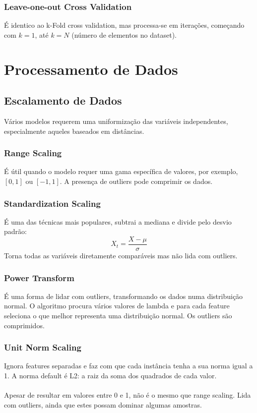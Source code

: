 \documentclass[10pt,a4paper]{report}
\begin{document}
\subsection{Leave-one-out Cross Validation}
É identico ao k-Fold cross validation, mas processa-se em iterações, começando com $k = 1$, até $k = N$ (número de elementos no dataset).

\chapter{Processamento de Dados}
\section{Escalamento de Dados}
Vários modelos requerem uma uniformização das variáveis independentes, especialmente aqueles baseados em distâncias.
\subsection{Range Scaling} 
É útil quando o modelo requer uma gama específica de valores, por exemplo, $[0,1]$ ou $[-1,1]$. A presença de outliers pode comprimir os dados.
\subsection{Standardization Scaling}
É uma das técnicas mais populares, subtrai a mediana e divide pelo desvio padrão:
$$
X_t = \frac{X - \mu}{\sigma}
$$
Torna todas as variáveis diretamente comparáveis mas não lida com outliers.
\subsection{Power Transform}
É uma forma de lidar com outliers, transformando os dados numa distribuição normal. O algoritmo procura vários valores de lambda e para cada feature seleciona o que melhor representa uma distribuição normal. Os outliers são comprimidos.
\subsection{Unit Norm Scaling}
Ignora features separadas e faz com que cada instância tenha a sua norma igual a 1. A norma default é L2: a raiz da soma dos quadrados de cada valor.\\
\\
Apesar de resultar em valores entre 0 e 1, não é o mesmo que range scaling. Lida com outliers, ainda que estes possam dominar algumas amostras.
\end{document}
